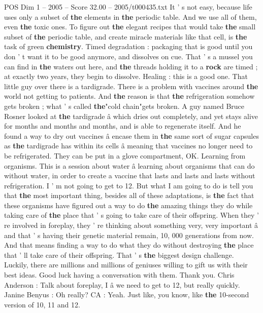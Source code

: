\begin{textsample}{POS Dim 1 – 2005 – Score 32.00 – 2005/t000435.txt}
It ' s not easy, because life uses only a subset of \textbf{the} elements in \textbf{the} periodic table.
And we use all of them, even \textbf{the} toxic ones.
To figure out \textbf{the} elegant recipes that would take \textbf{the} small subset of \textbf{the} periodic table, and create miracle materials like that cell, is \textbf{the} task of green \textbf{chemistry}.
Timed degradation : packaging that is good until you don ' t want it to be good anymore, and dissolves on cue.
That ' s a mussel you can find in \textbf{the} waters out here, and \textbf{the} threads holding it to a \textbf{rock} are timed ; at exactly two years, they begin to dissolve.
Healing : this is a good one.
That little guy over there is a tardigrade.
There is a problem with vaccines around \textbf{the} world not getting to patients.
And \textbf{the} reason is that \textbf{the} refrigeration somehow gets broken ; what ' s called \textbf{the}"cold chain"gets broken.
A guy named Bruce Rosner looked at \textbf{the} tardigrade â which dries out completely, and yet stays alive for months and months and months, and is able to regenerate itself.
And he found a way to dry out vaccines â encase them in \textbf{the} same sort of sugar capsules as \textbf{the} tardigrade has within its cells â meaning that vaccines no longer need to be refrigerated.
They can be put in a glove compartment, OK.
Learning from organisms.
This is a session about water â learning about organisms that can do without water, in order to create a vaccine that lasts and lasts and lasts without refrigeration.
I ' m not going to get to 12.
But what I am going to do is tell you that \textbf{the} most important thing, besides all of these adaptations, is \textbf{the} fact that these organisms have figured out a way to do \textbf{the} amazing things they do while taking care of \textbf{the} place that ' s going to take care of their offspring.
When they ' re involved in foreplay, they ' re thinking about something very, very important â and that ' s having their genetic material remain, 10, 000 generations from now.
And that means finding a way to do what they do without destroying \textbf{the} place that ' ll take care of their offspring.
That ' s \textbf{the} biggest design challenge.
Luckily, there are millions and millions of geniuses willing to gift us with their best ideas.
Good luck having a conversation with them.
Thank you.
Chris Anderson : Talk about foreplay, I â we need to get to 12, but really quickly.
Janine Benyus : Oh really?
CA : Yeah.
Just like, you know, like \textbf{the} 10-second version of 10, 11 and 12.

\end{textsample}
